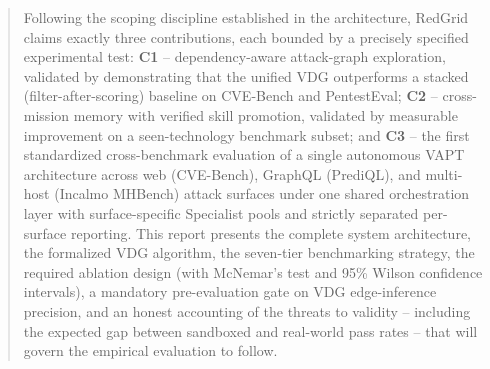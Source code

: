 \begin{abstract}
\vspace{0.3cm}
\hspace{1cm} Following the scoping discipline established in the architecture, RedGrid claims exactly three contributions, each bounded by a precisely specified experimental test: \textbf{C1} -- dependency-aware attack-graph exploration, validated by demonstrating that the unified VDG outperforms a stacked (filter-after-scoring) baseline on CVE-Bench and PentestEval; \textbf{C2} -- cross-mission memory with verified skill promotion, validated by measurable improvement on a seen-technology benchmark subset; and \textbf{C3} -- the first standardized cross-benchmark evaluation of a single autonomous VAPT architecture across web (CVE-Bench), GraphQL (PrediQL), and multi-host (Incalmo MHBench) attack surfaces under one shared orchestration layer with surface-specific Specialist pools and strictly separated per-surface reporting. This report presents the complete system architecture, the formalized VDG algorithm, the seven-tier benchmarking strategy, the required ablation design (with McNemar's test and 95\% Wilson confidence intervals), a mandatory pre-evaluation gate on VDG edge-inference precision, and an honest accounting of the threats to validity -- including the expected gap between sandboxed and real-world pass rates -- that will govern the empirical evaluation to follow.

\end{abstract}

\clearpage
{}
